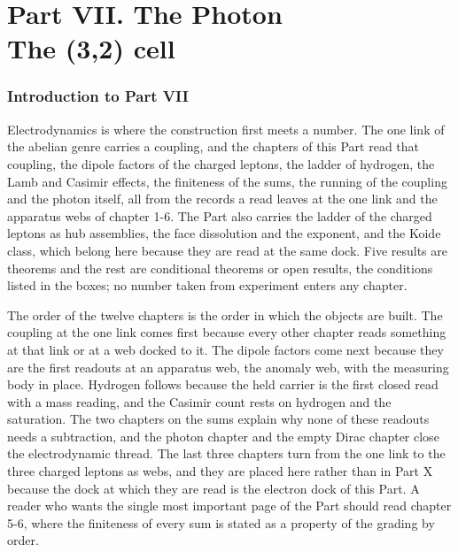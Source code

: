 \clearpage
\part*{Part VII. The Photon\\[5pt]{\large The (3,2) cell}}
\label{atlaspart:07-cell-3-2-photon}
\section*{Introduction to Part VII}\label{narr:part:V}
Electrodynamics is where the construction first meets a number. The one link of the abelian genre carries a coupling, and the chapters of this Part read that coupling, the dipole factors of the charged leptons, the ladder of hydrogen, the Lamb and Casimir effects, the finiteness of the sums, the running of the coupling and the photon itself, all from the records a read leaves at the one link and the apparatus webs of chapter 1-6. The Part also carries the ladder of the charged leptons as hub assemblies, the face dissolution and the exponent, and the Koide class, which belong here because they are read at the same dock. Five results are theorems and the rest are conditional theorems or open results, the conditions listed in the boxes; no number taken from experiment enters any chapter.

The order of the twelve chapters is the order in which the objects are built. The coupling at the one link comes first because every other chapter reads something at that link or at a web docked to it. The dipole factors come next because they are the first readouts at an apparatus web, the anomaly web, with the measuring body in place. Hydrogen follows because the held carrier is the first closed read with a mass reading, and the Casimir count rests on hydrogen and the saturation. The two chapters on the sums explain why none of these readouts needs a subtraction, and the photon chapter and the empty Dirac chapter close the electrodynamic thread. The last three chapters turn from the one link to the three charged leptons as webs, and they are placed here rather than in Part X because the dock at which they are read is the electron dock of this Part. A reader who wants the single most important page of the Part should read chapter 5-6, where the finiteness of every sum is stated as a property of the grading by order.

